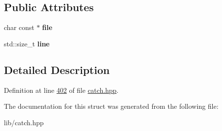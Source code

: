 \subsection*{Public Attributes}
\begin{DoxyCompactItemize}
\item 
\mbox{\label{structCatch_1_1SourceLineInfo_ad65537703e9f08c1fa7777fbc3f0c617}} 
char const  $\ast$ {\bfseries file}
\item 
\mbox{\label{structCatch_1_1SourceLineInfo_a841e5d696c7b9cde24e45e61dd979c77}} 
std\+::size\+\_\+t {\bfseries line}
\end{DoxyCompactItemize}


\subsection{Detailed Description}


Definition at line \mbox{\hyperlink{catch_8hpp_source_l00402}{402}} of file \mbox{\hyperlink{catch_8hpp_source}{catch.\+hpp}}.



The documentation for this struct was generated from the following file\+:\begin{DoxyCompactItemize}
\item 
lib/catch.\+hpp\end{DoxyCompactItemize}
